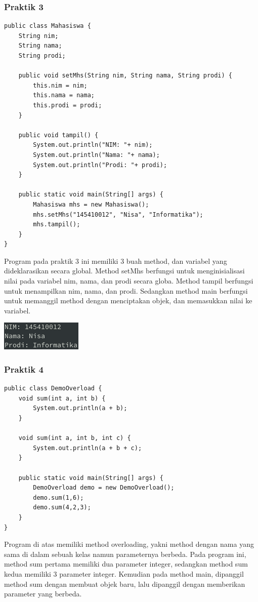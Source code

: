 \documentclass[a4paper,12pt]{article}
\begin{document}
\subsubsection{Praktik 3}
\begin{lstlisting}
public class Mahasiswa {
    String nim;
    String nama;
    String prodi;

    public void setMhs(String nim, String nama, String prodi) {
        this.nim = nim;
        this.nama = nama;
        this.prodi = prodi;
    }

    public void tampil() {
        System.out.println("NIM: "+ nim);
        System.out.println("Nama: "+ nama);
        System.out.println("Prodi: "+ prodi);
    }

    public static void main(String[] args) {
        Mahasiswa mhs = new Mahasiswa();
        mhs.setMhs("145410012", "Nisa", "Informatika");
        mhs.tampil();
    }
}
\end{lstlisting}
Program pada praktik 3 ini memiliki 3 buah method, dan variabel yang dideklarasikan secara global. Method setMhs
berfungsi untuk menginisialisasi nilai pada variabel nim, nama, dan prodi secara globa. Method tampil berfungsi untuk
menampilkan nim, nama, dan prodi. Sedangkan method main berfungsi untuk memanggil method dengan menciptakan objek, dan
memasukkan nilai ke variabel.

\begin{center}
    \includegraphics[scale=1]{3.png} 
\end{center}


\subsubsection{Praktik 4}
\begin{lstlisting}
public class DemoOverload {
    void sum(int a, int b) {
        System.out.println(a + b);
    }

    void sum(int a, int b, int c) {
        System.out.println(a + b + c);
    }

    public static void main(String[] args) {
        DemoOverload demo = new DemoOverload();
        demo.sum(1,6);
        demo.sum(4,2,3);
    }
}
\end{lstlisting}
Program di atas memiliki method overloading, yakni method dengan nama yang sama di dalam sebuah kelas namun
parameternya berbeda. Pada program ini, method sum pertama memiliki dua parameter integer, sedangkan method sum kedua
memiliki 3 parameter integer. Kemudian pada method main, dipanggil method sum dengan membuat objek baru, lalu dipanggil
dengan memberikan parameter yang berbeda.
\end{document}

